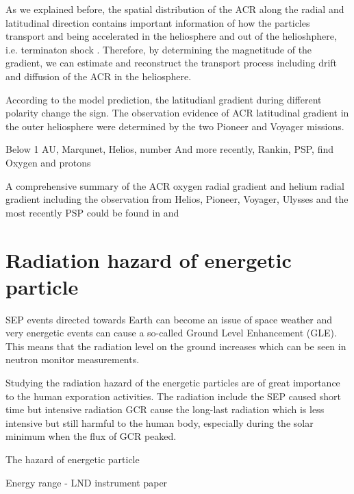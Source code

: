 As we explained before, the spatial distribution of the \ac{ACR} along the radial and latitudinal direction contains important information of how the particles transport and being accelerated in the heliosphere and out of the helioshphere, i.e. terminaton shock \cite{Rankin2021ApJ}.  Therefore, by determining the magnetitude of the gradient, we can estimate and reconstruct the transport process including drift and diffusion of the \ac{ACR} in the heliosphere.

According to the model prediction, the latitudianl gradient during different polarity change the sign. The observation evidence of \ac{ACR} latitudinal gradient in the outer heliosphere were determined by the two Pioneer and Voyager missions. 


Below 1 AU, Marqunet, Helios, number 
And more recently, Rankin, PSP, find Oxygen and protons
 
A comprehensive summary of the ACR oxygen radial gradient and helium radial gradient including the observation from Helios, Pioneer, Voyager, Ulysses and the most recently PSP could be found in \citet{Rankin2021ApJ} and \citep{Rankin2022ApJ}


\section{Radiation hazard of energetic particle}

SEP events directed towards Earth can become an issue of space weather and
very energetic events can cause a so-called Ground Level Enhancement (GLE).
This means that the radiation level on the ground increases which can be seen in
neutron monitor measurements.

Studying the radiation hazard of the energetic particles are of great importance to the human exporation activities.
The radiation include the SEP caused short time but intensive radiation
GCR cause the long-last radiation which is less intensive but still harmful to the human body, especially during the solar minimum when the flux of GCR peaked.

The hazard of energetic particle 

Energy range - LND instrument paper

